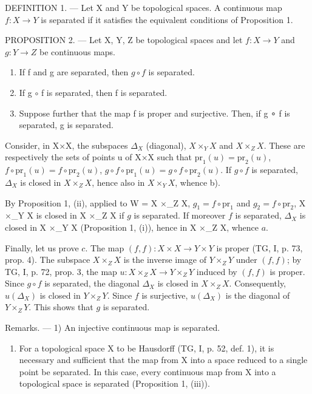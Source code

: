 DEFINITION 1. --- Let X and Y be topological spaces. A continuous map \(f: X \to Y\) is separated if it satisfies the equivalent conditions of Proposition 1.

PROPOSITION 2. --- Let X, Y, Z be topological spaces and let \(f\colon X \to Y\) and \(g\colon Y \to Z\) be continuous maps.

\begin{enumerate}
\def\labelenumi{\alph{enumi})}
\item
  If f and g are separated, then \(g \circ f\) is separated.
\item
If g \(\circ\) f is separated, then f is separated.
\item
  Suppose further that the map f is proper and surjective. Then, if g ∘ f is separated, g is separated.
\end{enumerate}

Consider, in X×X, the subspaces \(\Delta_{X}\) (diagonal), \(X \times_Y X\) and \(X \times_Z X\). These are respectively the sets of points u of X×X such that \(\mathrm{pr}_{1}(u)=\mathrm{pr}_{2}(u)\), \(f\circ\mathrm{pr}_{1}(u)=f\circ\mathrm{pr}_{2}(u)\), \(g\circ f\circ\mathrm{pr}_{1}(u)=g\circ f\circ\mathrm{pr}_{2}(u)\). If \(g\circ f\) is separated, \(\Delta_{X}\) is closed in \(X \times_Z X\), hence also in \(X \times_Y X\), whence b).

By Proposition 1, (ii), applied to W = X ×\_Z X, \(g_1 = f \circ \text{pr}_1\) and \(g_2 = f \circ \text{pr}_2\), X ×\_Y X is closed in X ×\_Z X if \(g\) is separated. If moreover \(f\) is separated, \(\Delta_X\) is closed in X ×\_Y X (Proposition 1, (i)), hence in X ×\_Z X, whence \(a\).

Finally, let us prove \(c\). The map \((f, f) \colon X \times X \to Y \times Y\) is proper (TG, I, p. 73, prop. 4). The subspace \(X \times_Z X\) is the inverse image of \(Y \times_Z Y\) under \((f, f)\); by TG, I, p. 72, prop. 3, the map \(u \colon X \times_Z X \to Y \times_Z Y\) induced by \((f, f)\) is proper. Since \(g \circ f\) is separated, the diagonal \(\Delta_X\) is closed in \(X \times_Z X\). Consequently, \(u(\Delta_X)\) is closed in \(Y \times_Z Y\). Since \(f\) is surjective, \(u(\Delta_X)\) is the diagonal of \(Y \times_Z Y\). This shows that \(g\) is separated.

Remarks. --- 1) An injective continuous map is separated.

\begin{enumerate}
\def\labelenumi{\arabic{enumi})}
\setcounter{enumi}{1}
\tightlist
\item
  For a topological space X to be Hausdorff (TG, I, p. 52, def. 1), it is necessary and sufficient that the map from X into a space reduced to a single point be separated. In this case, every continuous map from X into a topological space is separated (Proposition 1, (iii)).
\end{enumerate}

